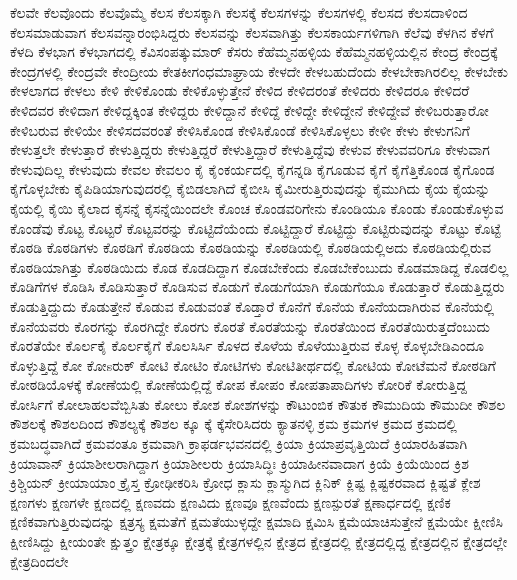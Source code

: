 {ಕೆಲವೇ
ಕೆಲವೊಂದು
ಕೆಲವೊಮ್ಮೆ
ಕೆಲಸ
ಕೆಲಸಕ್ಕಾಗಿ
ಕೆಲಸಕ್ಕೆ
ಕೆಲಸಗಳನ್ನು
ಕೆಲಸಗಳಲ್ಲಿ
ಕೆಲಸದ
ಕೆಲಸದಾಳಿಂದ
ಕೆಲಸಮಾಡುವಾಗ
ಕೆಲಸವನ್ನಾರಂಭಿಸಿದ್ದರು
ಕೆಲಸವನ್ನು
ಕೆಲಸವಾಗಿತ್ತು
ಕೆಲಸಕಾರ್ಯಗಳಿಗಾಗಿ
ಕೆಲೆವು
ಕೆಳಗಿನ
ಕೆಳಗೆ
ಕೆಳದಿ
ಕೆಳಭಾಗ
ಕೆಳಭಾಗದಲ್ಲಿ
ಕೆವಿಸಂಪತ್ಕುಮಾರ್
ಕೆಸರು
ಕೆಹೆಮ್ಮನಹಳ್ಳಿಯ
ಕೆಹೆಮ್ಮನಹಳ್ಳಿಯಲ್ಲಿನ
ಕೇಂದ್ರ
ಕೇಂದ್ರಕ್ಕೆ
ಕೇಂದ್ರಗಳಲ್ಲಿ
ಕೇಂದ್ರವೇ
ಕೇಂದ್ರೀಯ
ಕೇತಕೀಗಂಧಮಾಘ್ರಾಯ
ಕೇಳದೇ
ಕೇಳಬಹುದೆಂದು
ಕೇಳಬೇಕಾಗಿರಲಿಲ್ಲ
ಕೇಳಬೇಕು
ಕೇಳಲಾಗದ
ಕೇಳಲು
ಕೇಳಿ
ಕೇಳಿಕೊಂಡು
ಕೇಳಿಕೊಳ್ಳುತ್ತೇನೆ
ಕೇಳಿದ
ಕೇಳಿದರಂತೆ
ಕೇಳಿದರು
ಕೇಳಿದರೂ
ಕೇಳಿದರೆ
ಕೇಳಿದವರ
ಕೇಳಿದಾಗ
ಕೇಳಿದ್ದಕ್ಕಿಂತ
ಕೇಳಿದ್ದರು
ಕೇಳಿದ್ದಾನೆ
ಕೇಳಿದ್ದೆ
ಕೇಳಿದ್ದೇ
ಕೇಳಿದ್ದೇನೆ
ಕೇಳಿದ್ದೇವೆ
ಕೇಳಿಬರುತ್ತಾರೋ
ಕೇಳಿಬರುವ
ಕೇಳಿಯೇ
ಕೇಳಿಸದವರಂತೆ
ಕೇಳಿಸಿಕೊಂಡ
ಕೇಳಿಸಿಕೊಂಡೆ
ಕೇಳಿಸಿಕೊಳ್ಳಲು
ಕೇಳೀ
ಕೇಳು
ಕೇಳುಗನಿಗೆ
ಕೇಳುತ್ತಲೇ
ಕೇಳುತ್ತಾರೆ
ಕೇಳುತ್ತಿದ್ದರು
ಕೇಳುತ್ತಿದ್ದರೆ
ಕೇಳುತ್ತಿದ್ದಾರೆ
ಕೇಳುತ್ತಿದ್ದೆವು
ಕೇಳುವ
ಕೇಳುವವರಿಗೂ
ಕೇಳುವಾಗ
ಕೇಳುವುದಿಲ್ಲ
ಕೇಳುವುದು
ಕೇವಲ
ಕೇವಲಂ
ಕೈ
ಕೈಂಕರ್ಯದಲ್ಲಿ
ಕೈಗನ್ನಡಿ
ಕೈಗೂಡುವ
ಕೈಗೆ
ಕೈಗೆತ್ತಿಕೊಂಡ
ಕೈಗೊಂಡ
ಕೈಗೊಳ್ಳಬೇಕು
ಕೈಪಿಡಿಯಾಗುವುದರಲ್ಲಿ
ಕೈಬಿಡಲಾಗಿದೆ
ಕೈಬೀಸಿ
ಕೈಮೀರುತ್ತಿರುವುದನ್ನು
ಕೈಮುಗಿದು
ಕೈಯ
ಕೈಯನ್ನು
ಕೈಯಲ್ಲಿ
ಕೈಯಿ
ಕೈಲಾದ
ಕೈಸನ್ನೆ
ಕೈಸನ್ನೆಯಿಂದಲೇ
ಕೊಂಚ
ಕೊಂಡವರಿಗೇನು
ಕೊಂಡಿಯೂ
ಕೊಂಡು
ಕೊಂಡುಕೊಳ್ಳುವ
ಕೊಂಡೆವು
ಕೊಟ್ಟ
ಕೊಟ್ಟರೆ
ಕೊಟ್ಟವರನ್ನು
ಕೊಟ್ಟಿದೆಯೆಂದು
ಕೊಟ್ಟಿದ್ದಾರೆ
ಕೊಟ್ಟಿದ್ದು
ಕೊಟ್ಟಿರುವುದನ್ನು
ಕೊಟ್ಟು
ಕೊಟ್ಟೆ
ಕೊಠಡಿ
ಕೊಠಡಿಗಳು
ಕೊಠಡಿಗೆ
ಕೊಠಡಿಯ
ಕೊಠಡಿಯನ್ನು
ಕೊಠಡಿಯಲ್ಲಿ
ಕೊಠಡಿಯಲ್ಲಿಅದು
ಕೊಠಡಿಯಲ್ಲಿರುವ
ಕೊಠಡಿಯಾಗಿತ್ತು
ಕೊಠಡಿಯಿದು
ಕೊಡ
ಕೊಡದಿದ್ದಾಗ
ಕೊಡಬೇಕೆಂದು
ಕೊಡಬೇಕೆಂಬುದು
ಕೊಡಮಾಡಿದ್ದ
ಕೊಡಲಿಲ್ಲ
ಕೊಡಿಗೆಗಳ
ಕೊಡಿಸಿ
ಕೊಡಿಸುತ್ತಾರೆ
ಕೊಡಿಸುವ
ಕೊಡುಗೆ
ಕೊಡುಗೆಯಾಗಿ
ಕೊಡುಗೆಯೂ
ಕೊಡುತ್ತಾರೆ
ಕೊಡುತ್ತಿದ್ದರು
ಕೊಡುತ್ತಿದ್ದುದು
ಕೊಡುತ್ತೇನೆ
ಕೊಡುವ
ಕೊಡುವಂತೆ
ಕೊಡ್ತಾರೆ
ಕೊನೆಗೆ
ಕೊನೆಯ
ಕೊನೆಯದಾಗಿರುವ
ಕೊನೆಯಲ್ಲಿ
ಕೊನೆಯವರು
ಕೊರಗನ್ನು
ಕೊರಗಿದ್ದೇ
ಕೊರಗು
ಕೊರತೆ
ಕೊರತೆಯನ್ನು
ಕೊರತೆಯಿಂದ
ಕೊರತೆಯಿರುತ್ತದೆಂಬುದು
ಕೊರತೆಯೇ
ಕೊರ್ಲಕೈ
ಕೊರ್ಲಕೈಗೆ
ಕೊಲಸಿರ್ಸಿ
ಕೊಳದ
ಕೊಳೆಯ
ಕೊಳೆಯುತ್ತಿರುವ
ಕೊಳ್ಳ
ಕೊಳ್ಳಬೇಡಿಎಂದೂ
ಕೊಳ್ಳುತ್ತಿದ್ದೆ
ಕೋ
ಕೋsರುಕ್
ಕೋಟಿ
ಕೋಟಿಂ
ಕೋಟಿಗಳು
ಕೋಟಿತೀರ್ಥದಲ್ಲಿ
ಕೋಟಿಯ
ಕೋಟೆಮನೆ
ಕೋಠಡಿಗೆ
ಕೋಠಡಿಯೊಳಕ್ಕೆ
ಕೋಣೆಯಲ್ಲಿ
ಕೋಣೆಯಲ್ಲಿದ್ದೆ
ಕೋಪ
ಕೋಪಂ
ಕೋಪತಾಪಾದಿಗಳು
ಕೋರಿಕೆ
ಕೋರುತ್ತಿದ್ದ
ಕೋರ್ಸಿಗೆ
ಕೋಲಾಹಲವೆಬ್ಬಿಸಿತು
ಕೋಲು
ಕೋಶ
ಕೋಶಗಳನ್ನು
ಕೌಟುಂಬಿಕ
ಕೌತುಕ
ಕೌಮುದಿಯ
ಕೌಮುದೀ
ಕೌಶಲ
ಕೌಶಲಕ್ಕೆ
ಕೌಶಲದಿಂದ
ಕೌಶಲ್ಯಕ್ಕೆ
ಕೌಶಲ
ಕ್ಕೂ
ಕ್ಕೆ
ಕ್ಕೆಸೇರಿಸಿದರು
ಕ್ಯಾತನಳ್ಳಿ
ಕ್ರಮ
ಕ್ರಮಗಳ
ಕ್ರಮದ
ಕ್ರಮದಲ್ಲಿ
ಕ್ರಮಬದ್ಧವಾಗಿದೆ
ಕ್ರಮವಂತೂ
ಕ್ರಮವಾಗಿ
ಕ್ರಾಫರ್ಡಭವನದಲ್ಲಿ
ಕ್ರಿಯಾ
ಕ್ರಿಯಾಪ್ರವೃತ್ತಿಯಿದೆ
ಕ್ರಿಯಾರಹಿತವಾಗಿ
ಕ್ರಿಯಾವಾನ್
ಕ್ರಿಯಾಶೀಲರಾಗಿದ್ದಾಗ
ಕ್ರಿಯಾಶೀಲರು
ಕ್ರಿಯಾಸಿದ್ಧಿಃ
ಕ್ರಿಯಾಹೀನವಾದಾಗ
ಕ್ರಿಯೆ
ಕ್ರಿಯೆಯಿಂದ
ಕ್ರಿಶ
ಕ್ರಿಶ್ಚಿಯನ್
ಕ್ರೀಯಾಯಾಂ
ಕ್ರೈಸ್ತ
ಕ್ರೋಢೀಕರಿಸಿ
ಕ್ರೋಧ
ಕ್ಲಾಸು
ಕ್ಲಾಸ್ಮುಗಿದ
ಕ್ಲಿನಿಕ್
ಕ್ಲಿಷ್ಟ
ಕ್ಲಿಷ್ಟಕರವಾದ
ಕ್ಲಿಷ್ಟತೆ
ಕ್ಲೇಶ
ಕ್ಷಣಗಳು
ಕ್ಷಣಗಳೇ
ಕ್ಷಣದಲ್ಲಿ
ಕ್ಷಣವದು
ಕ್ಷಣವಿದು
ಕ್ಷಣವೂ
ಕ್ಷಣವೆಂದು
ಕ್ಷಣಸ್ಪುರತೆ
ಕ್ಷಣಾರ್ಧದಲ್ಲಿ
ಕ್ಷಣಿಕ
ಕ್ಷಣಿಕವಾಗುತ್ತಿರುವುದನ್ನು
ಕ್ಷತ್ರಸ್ಯ
ಕ್ಷಮತೆಗೆ
ಕ್ಷಮತೆಯುಳ್ಳದ್ದೇ
ಕ್ಷಮಾದಿ
ಕ್ಷಮಿಸಿ
ಕ್ಷಮೆಯಾಚಿಸುತ್ತೇನೆ
ಕ್ಷಮೆಯೇ
ಕ್ಷೀಣಿಸಿ
ಕ್ಷೀಣಿಸಿದ್ದು
ಕ್ಷೀಯಂತೇ
ಕ್ಷುತ್ತ್ರಂ
ಕ್ಷೇತ್ರಕ್ಕೂ
ಕ್ಷೇತ್ರಕ್ಕೆ
ಕ್ಷೇತ್ರಗಳಲ್ಲಿನ
ಕ್ಷೇತ್ರದ
ಕ್ಷೇತ್ರದಲ್ಲಿ
ಕ್ಷೇತ್ರದಲ್ಲಿದ್ದ
ಕ್ಷೇತ್ರದಲ್ಲಿನ
ಕ್ಷೇತ್ರದಲ್ಲೇ
ಕ್ಷೇತ್ರದಿಂದಲೇ
}
